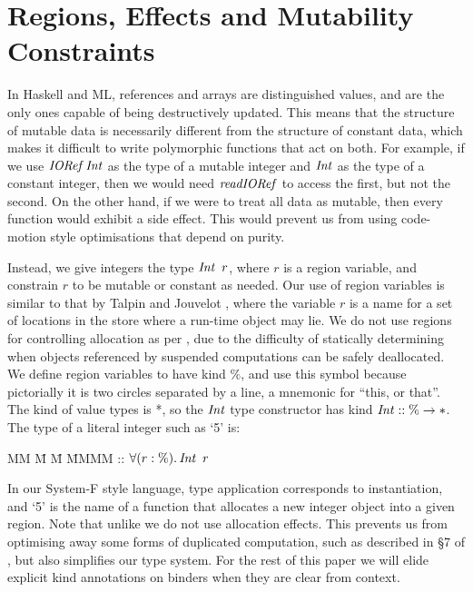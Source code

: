 
\section{Regions, Effects and Mutability Constraints}
In Haskell and ML, references and arrays are distinguished values, and are the only ones capable of being destructively updated. This means that the structure of mutable data is necessarily different from the structure of constant data, which makes it difficult to write polymorphic functions that act on both. For example, if we use $\operatorname{\mathit{IORef}} \operatorname{\mathit{Int}}$ as the type of a mutable integer and $\operatorname{\mathit{Int}}$ as the type of a constant integer, then we would need $\operatorname{\mathit{readIORef}}$ to access the first, but not the second. On the other hand, if we were to treat all data as mutable, then every function would exhibit a side effect. This would prevent us from using code-motion style optimisations that depend on purity.

Instead, we give integers the type $\operatorname{\mathit{Int}} \ r$, where $r$ is a region variable, and constrain $r$ to be mutable or constant as needed. Our use of region variables is similar to that by Talpin and Jouvelot \cite{talpin:type-and-effect-discipline}, where the variable $r$ is a name for a set of locations in the store where a run-time object may lie. We do not use regions for controlling allocation as per \cite{tofte:mlkit-4.3.0}, due to the difficulty of statically determining when objects referenced by suspended computations can be safely deallocated. We define region variables to have kind $\%$, and use this symbol because pictorially it is two circles separated by a line, a mnemonic for ``this, or that''. The kind of value types is *, so the $\operatorname{\mathit{Int}}$ type constructor has kind $\operatorname{\mathit{Int}} :: \% \to *$. The type of a literal integer such as `5' is:
\begin{tabbing}
MM	\= M \= M \= MMMM \kill
		\> :: \> $\forall (r : \%). \operatorname{\mathit{Int}} \ r$
\end{tabbing}
In our System-F style language, type application corresponds to instantiation, and `5' is the name of a function that allocates a new integer object into a given region. Note that unlike \cite{talpin:type-and-effect-discipline} we do not use allocation effects. This prevents us from optimising away some forms of duplicated computation, such as described in \S7 of \cite{benton:relational-semantics-effect-transformations}, but also simplifies our type system. For the rest of this paper we will elide explicit kind annotations on binders when they are clear from context.


